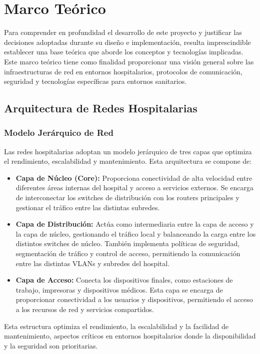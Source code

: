 
\chapter{Marco Teórico}\label{MarcoTeórico}
Para comprender en profundidad el desarrollo de este proyecto y justificar las decisiones adoptadas durante su diseño e implementación, resulta imprescindible establecer 
una base teórica que aborde los conceptos y tecnologías implicadas. Este marco teórico tiene como finalidad proporcionar una visión general sobre las 
infraestructuras de red en entornos hospitalarios, protocolos de comunicación, seguridad y tecnologías específicas para entornos sanitarios.

\section{Arquitectura de Redes Hospitalarias}

\subsection{Modelo Jerárquico de Red}
Las redes hospitalarias adoptan un modelo jerárquico de tres capas que optimiza el rendimiento, escalabilidad y mantenimiento. Esta arquitectura se compone de:
\begin{itemize}
    \item \textbf{Capa de Núcleo (Core):} Proporciona conectividad de alta velocidad entre diferentes áreas internas del hospital y acceso a servicios externos. Se encarga de 
    interconectar los switches de distribución con los routers principales y gestionar el tráfico entre las distintas subredes.
    \item \textbf{Capa de Distribución:} Actúa como intermediaria entre la capa de acceso y la capa de núcleo, gestionando el tráfico local y balanceando la carga
    entre los distintos switches de núcleo. También implementa políticas de seguridad, segmentación de tráfico y control de acceso, permitiendo la comunicación entre las distintas 
    VLANs y subredes del hospital.
    \item \textbf{Capa de Acceso:} Conecta los dispositivos finales, como estaciones de trabajo, impresoras y dispositivos médicos. Esta capa se encarga de proporcionar
    conectividad a los usuarios y dispositivos, permitiendo el acceso a los recursos de red y servicios compartidos. 
\end{itemize}
Esta estructura optimiza el rendimiento, la escalabilidad y la facilidad de mantenimiento, aspectos críticos en entornos hospitalarios donde la disponibilidad y la seguridad son prioritarias.

